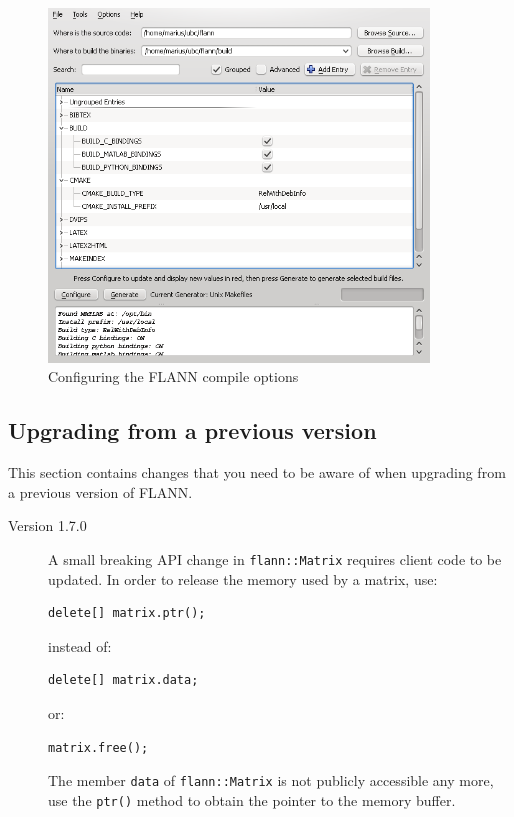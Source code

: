 \documentclass[letter,10pt]{article}
\begin{document}
\begin{figure}[h]
  \begin{center}
    \includegraphics[width=0.9\textwidth]{images/cmake-gui.png}
    \caption{Configuring the FLANN compile options}
    \label{fig:cmake-gui}
  \end{center}
\end{figure}

\subsection{Upgrading from a previous version}

This section contains changes that you need to be aware of when upgrading from a previous version of FLANN.

\begin{description}
 \item[Version 1.7.0] A small breaking API change in \texttt{flann::Matrix} requires client code to be updated. In order
to release the memory used by a matrix, use:
\begin{Verbatim}[fontsize=\scriptsize]
 delete[] matrix.ptr();
\end{Verbatim}
instead of:
\begin{Verbatim}[fontsize=\scriptsize]
 delete[] matrix.data;
\end{Verbatim}
or:
\begin{Verbatim}[fontsize=\scriptsize]
 matrix.free();
\end{Verbatim}
The member \texttt{data} of \texttt{flann::Matrix} is not publicly accessible any more, use the \texttt{ptr()} method
to obtain the pointer to the memory buffer.
\end{description}
\end{document}
